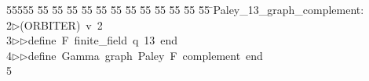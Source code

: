 %
%
\begin{tabbing}
55555 \= 55 \= 55 \= 55 \= 55 \= 55 \= 55 \= 55 \= 55 \= 55 \= 55 \= 55 \= 55 \= \>Paley\_13\_graph\_complement:\\[0pt]
2\>$\triangleright$\>(ORBITER)\ v\ 2\ \\[0pt]
3\>$\triangleright$\>$\triangleright$\>define\ F\ finite\_field\ q\ 13\ end\ \\[0pt]
4\>$\triangleright$\>$\triangleright$\>define\ Gamma\ graph\ Paley\ F\ complement\ end\ \\[0pt]
5\>\end{tabbing}
